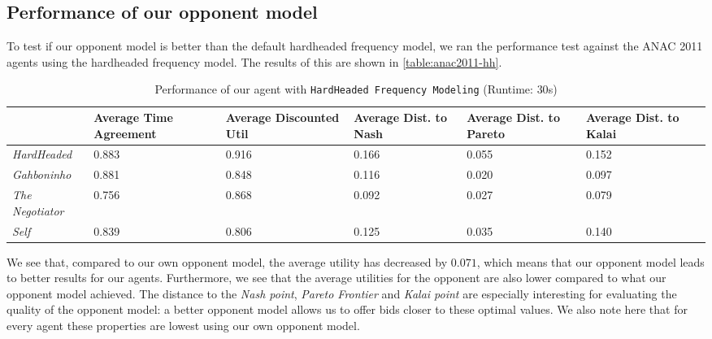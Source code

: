\subsection{Performance of our opponent model}
To test if our opponent model is better than the default hardheaded frequency model, we ran the performance test against the ANAC 2011 agents using the hardheaded frequency model. The results of this are shown in \autoref{table:anac2011-hh}.
\begin{table}[H]
	\centering
	\small
    \begin{tabular}{l|p{2cm}|p{2cm}|p{2cm}|p{2cm}|p{2cm}|p{2cm}|}
    ~              & Average Time Agreement & Average Discounted Util & Average Dist. to Nash & Average Dist. to Pareto & Average Dist. to Kalai \\
    \hline
    \emph{HardHeaded}		& 0.883  & 0.916  & 0.166  & 0.055  & 0.152   \\ \hline
    \emph{Gahboninho}   	& 0.881  & 0.848  & 0.116  & 0.020  & 0.097   \\ \hline
    \emph{The Negotiator} 	& 0.756  & 0.868  & 0.092  & 0.027  & 0.079   \\ \hline
    \emph{Self}             & 0.839  & 0.806  & 0.125  & 0.035  & 0.140   \\ \hline
    \end{tabular}
    \caption{Performance of our agent with \texttt{HardHeaded Frequency Modeling} (Runtime: $30$s) \label{table:anac2011-hh}}
\end{table}
We see that, compared to our own opponent model, the average utility has decreased by $0.071$, which means that our opponent model leads to  better results for our agents. 
Furthermore, we see that the average utilities for the opponent are also lower compared to what our opponent model achieved.
The distance to the \emph{Nash point}, \emph{Pareto Frontier} and \emph{Kalai point} are especially interesting for evaluating the quality of the opponent model: a better opponent model allows us to offer bids closer to these optimal values. We also note here that for every agent these properties are lowest using our own opponent model.

